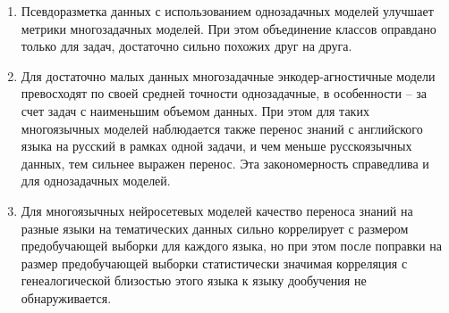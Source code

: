 {}
\begin{enumerate}
  \item {Псевдоразметка данных с использованием однозадачных моделей улучшает метрики многозадачных моделей. При этом объединение классов оправдано только для задач, достаточно сильно похожих друг на друга.}
  \item {Для достаточно малых данных многозадачные энкодер-агностичные модели превосходят по своей средней точности однозадачные, в особенности -- за счет задач с наименьшим объемом данных. При этом для таких многоязычных моделей наблюдается также перенос знаний с английского языка на русский в рамках одной задачи, и чем меньше русскоязычных данных, тем сильнее выражен перенос. Эта закономерность справедлива и для однозадачных моделей.}
  \item {Для многоязычных нейросетевых моделей качество переноса знаний на разные языки на тематических данных сильно коррелирует с размером предобучающей выборки для каждого языка, но при этом после поправки на размер предобучающей выборки статистически значимая корреляция с генеалогической близостью этого языка к языку дообучения не обнаруживается.}
\end{enumerate}


\iffalse
Направления исследований 1.2.2:
1. Разработка новых математических методов моделирования объектов и
явлений (физико-математические науки).
2. Разработка, обоснование и тестирование эффективных вычислительных
методов с применением современных компьютерных технологий.
3. Реализация эффективных численных методов и алгоритмов в виде
комплексов проблемно-ориентированных программ для проведения
вычислительного эксперимента.
4. Разработка новых математических методов и алгоритмов интерпретации
натурного эксперимента на основе его математической модели.
5. Разработка новых математических методов и алгоритмов валидации
математических моделей объектов на основе данных натурного эксперимента
или на основе анализа математических моделей.
6. Разработка систем компьютерного и имитационного моделирования,
алгоритмов и методов имитационного моделирования на основе анализа
математических моделей (технические науки).
7. Качественные или аналитические методы исследования математических
моделей (технические науки).
8. Комплексные исследования научных и технических проблем с
применением современной технологии математического моделирования и
вычислительного эксперимента.
9. Постановка и проведение численных экспериментов, статистический
анализ их результатов, в том числе с применением современных
компьютерных технологий (технические науки).
\fi


